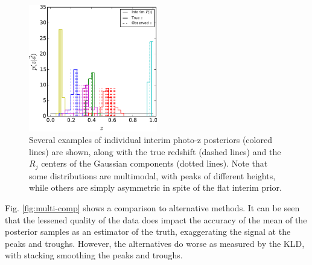 \documentclass[preprint]{aastex}
\begin{document}
\begin{figure}
\includegraphics[width=0.5\textwidth]{figs/mult/samplepzs.pdf}
\caption{Several examples of individual interim photo-z posteriors (colored 
lines) are shown, along with the true redshift (dashed lines) and the $R_{j}$ 
centers of the Gaussian components (dotted lines).  Note that some 
distributions are multimodal, with peaks of different heights, while others are 
simply asymmetric in spite of the flat interim prior.}
\label{fig:multipzs}
\end{figure}

Fig. \ref{fig:multi-comp} shows a comparison to alternative methods.  It can be 
seen that the lessened quality of the data does impact the accuracy of the mean 
of the posterior samples as an estimator of the truth, exaggerating the signal 
at the peaks and troughs.  However, the alternatives do worse as measured by 
the KLD, with stacking smoothing the peaks and troughs.

\end{document}
